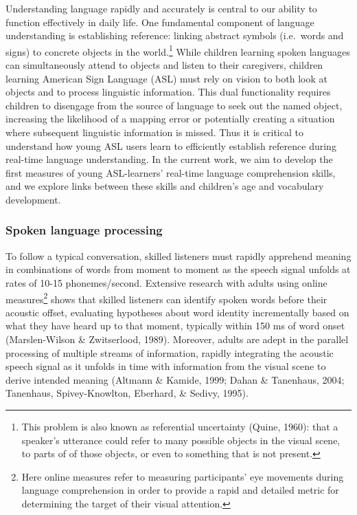 \documentclass[12pt,]{article}
\let\rmarkdownfootnote\footnote%
\def\footnote{\protect\rmarkdownfootnote}
\begin{document}
Understanding language rapidly and accurately is central to our ability
to function effectively in daily life. One fundamental component of
language understanding is establishing reference: linking abstract
symbols (i.e.~words and signs) to concrete objects in the
world.\footnote{This problem is also known as referential uncertainty
  (Quine, 1960): that a speaker's utterance could refer to many possible
  objects in the visual scene, to parts of of those objects, or even to
  something that is not present.} While children learning spoken
languages can simultaneously attend to objects and listen to their
caregivers, children learning American Sign Language (ASL) must rely on
vision to both look at objects and to process linguistic information.
This dual functionality requires children to disengage from the source
of language to seek out the named object, increasing the likelihood of a
mapping error or potentially creating a situation where subsequent
linguistic information is missed. Thus it is critical to understand how
young ASL users learn to efficiently establish reference during
real-time language understanding. In the current work, we aim to develop
the first measures of young ASL-learners' real-time language
comprehension skills, and we explore links between these skills and
children's age and vocabulary development.

\subsubsection{Spoken language
processing}\label{spoken-language-processing}

To follow a typical conversation, skilled listeners must rapidly
apprehend meaning in combinations of words from moment to moment as the
speech signal unfolds at rates of 10-15 phonemes/second. Extensive
research with adults using online measures\footnote{Here online measures
  refer to measuring participants' eye movements during language
  comprehension in order to provide a rapid and detailed metric for
  determining the target of their visual attention.} shows that skilled
listeners can identify spoken words before their acoustic offset,
evaluating hypotheses about word identity incrementally based on what
they have heard up to that moment, typically within 150 ms of word onset
(Marslen-Wilson \& Zwitserlood, 1989). Moreover, adults are adept in the
parallel processing of multiple streams of information, rapidly
integrating the acoustic speech signal as it unfolds in time with
information from the visual scene to derive intended meaning (Altmann \&
Kamide, 1999; Dahan \& Tanenhaus, 2004; Tanenhaus, Spivey-Knowlton,
Eberhard, \& Sedivy, 1995).
\end{document}
